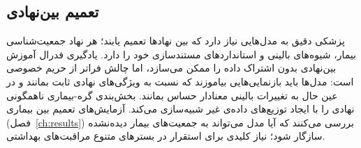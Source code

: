 \subsection{تعمیم بین‌نهادی}

پزشکی دقیق به مدل‌هایی نیاز دارد که بین نهادها تعمیم یابند؛ هر نهاد جمعیت‌شناسی بیمار، شیوه‌های بالینی و استانداردهای مستندسازی خود را دارد. یادگیری فدرال آموزش بین‌نهادی بدون اشتراک داده را ممکن می‌سازد، اما چالش فراتر از حریم خصوصی است: مدل‌ها باید بازنمایی‌هایی بیاموزند که نسبت به ویژگی‌های نهادی ثابت بمانند و در عین حال به تغییرات بالینی معنادار حساس بمانند. بخش‌بندی گره-بیماری ناهمگونی نهادی را با ایجاد توزیع‌های داده‌ی غیر  شبیه‌سازی می‌کند. آزمایش‌های تعمیم بین بیماری (فصل~\ref{ch:results}) بررسی می‌کنند که آیا مدل می‌تواند به جمعیت‌های بیمار دیده‌نشده سازگار شود؛ نیاز کلیدی برای استقرار در بسترهای متنوع مراقبت‌های بهداشتی.
